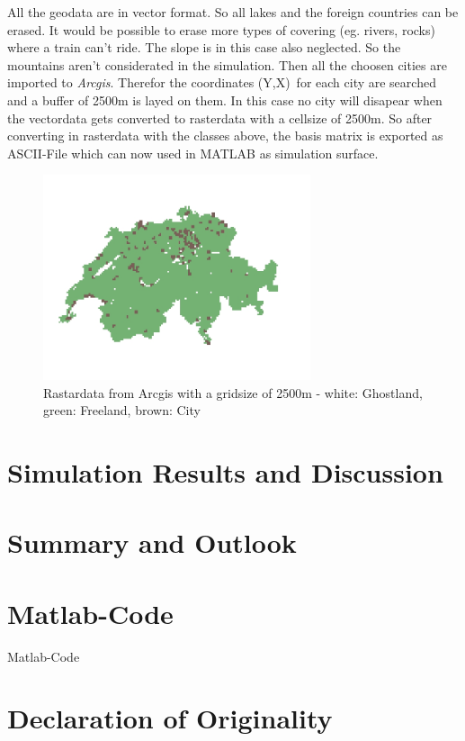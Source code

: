 \documentclass[11pt]{scrartcl}
\begin{document}
All the geodata are in vector format. So all lakes and the foreign countries can be erased. It would be possible to erase more types of covering (eg. rivers, rocks) where a train can't ride. The slope is in this case also neglected. So the mountains aren't considerated in the simulation. Then all the choosen cities are imported to \textit{Arcgis}. Therefor the coordinates (Y,X)\,\cite{coordinates} for each city are searched and a buffer of 2500m is layed on them. In this case no city will disapear when the vectordata gets converted to rasterdata with a cellsize of 2500m. So after converting in rasterdata with the classes above, the basis matrix is exported as ASCII-File which can now used in MATLAB as simulation surface.



\begin{figure}[H]
	\centering
	\includegraphics[width=0.7\textwidth]{map_2500_cities.jpg}
	\caption{Rastardata from Arcgis with a gridsize of 2500m - white: Ghostland, green: Freeland, brown: City}
	\label{fig:map_cities}
\end{figure}

\section{Simulation Results and Discussion}

\section{Summary and Outlook}

\appendix
\section{Matlab-Code}

Matlab-Code

\section{Declaration of Originality}





\end{document}
